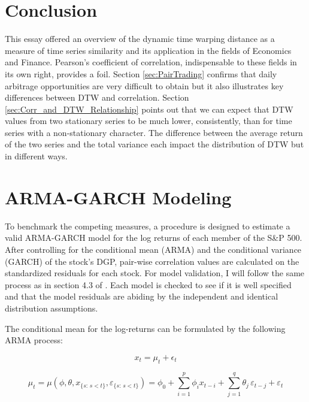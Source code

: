 \documentclass[12pt]{report}
\begin{document}
\chapter{Conclusion} \label{sec:Conclusion}

This essay offered an overview of the dynamic time warping distance as a measure of time series similarity and its application in the fields of Economics and Finance. Pearson's coefficient of correlation, indispensable to these fields in its own right, provides a foil. Section \ref{sec:PairTrading} confirms that daily arbitrage opportunities are very difficult to obtain but it also illustrates key differences between DTW and correlation. Section \ref{sec:Corr_and_DTW_Relationship} points out that we can expect that DTW values from two stationary series to be much lower, consistently, than for time series with a non-stationary character. The difference between the average return of the two series and the total variance each impact the distribution of DTW but in different ways.  


\appendix 

\chapter{ARMA-GARCH Modeling} \label{sec:ARMAGARCH-benchmark}

To benchmark the competing measures, a procedure is designed to estimate a valid ARMA-GARCH model for the log returns of each member of the S\&P 500. After controlling for the conditional mean (ARMA) and the conditional variance (GARCH) of the stock's DGP, pair-wise correlation values are calculated on the standardized residuals for each stock. For model validation, I will follow the same process as in section 4.3 of \cite{DowiakTV-COP}. Each model is checked to see if it is well specified and that the model residuals are abiding by the independent and identical distribution assumptions.

The conditional mean for the log-returns can be formulated by the following ARMA process:

\begin{equation} \label{eqn:marginalModel}
    x_{t} = \mu_{t} + \epsilon_{t}
\end{equation}

\begin{equation} \label{eq:conditional_mean}
    \mu_{t} = \mu(\phi, \theta, x_{\{s:\, s < t\}}, \varepsilon_{\{s:\, s < t\}}) = \phi_{0} + \sum_{i=1}^{p} \phi_{i} x_{t-i} + \sum_{j=1}^{q} \theta_{j} \, \varepsilon_{t - j} + \varepsilon_{t}
\end{equation}
\end{document}
